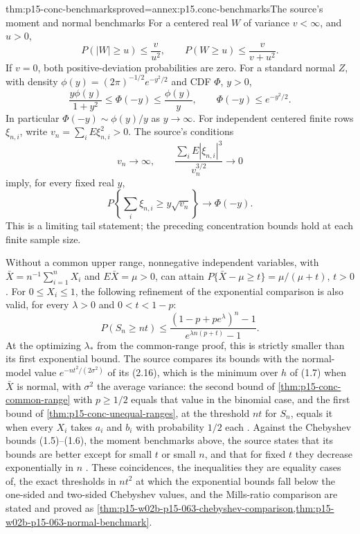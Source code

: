 \begin{hbtheorem}{thm:p15-conc-benchmarks}{proved=annex:p15.conc-benchmarks}{The source's moment and normal benchmarks}
For a centered real \(W\) of variance \(v<\infty\), and \(u>0\),
\[
 P(|W|\geq u)\leq\frac{v}{u^2},\qquad
 P(W\geq u)\leq\frac{v}{v+u^2}.
\]
If \(v=0\), both positive-deviation probabilities are zero.
For a standard normal \(Z\), with density
\(\phi(y)=(2\pi)^{-1/2}e^{-y^2/2}\) and CDF \(\Phi\), \(y>0\),
\[
 \frac{y\phi(y)}{1+y^2}\leq\Phi(-y)\leq\frac{\phi(y)}y,
 \qquad \Phi(-y)\leq e^{-y^2/2}.
\]
In particular \(\Phi(-y)\sim\phi(y)/y\) as \(y\to\infty\).
For independent centered finite rows \(\xi_{n,i}\), write
\(v_n=\sum_iE\xi_{n,i}^2>0\). The source's conditions
\[
 v_n\longrightarrow\infty,\qquad
 \frac{\sum_iE|\xi_{n,i}|^3}{v_n^{3/2}}\longrightarrow0
\]
imply, for every fixed real \(y\),
\[
             P\left\{\sum_i\xi_{n,i}\geq y\sqrt{v_n}\right\}
                                  \longrightarrow\Phi(-y).
\]
This is a limiting tail statement; the preceding concentration
bounds hold at each finite sample size.

Without a common upper range, nonnegative independent variables,
with \(\bar X=n^{-1}\sum_{i=1}^nX_i\) and \(E\bar X=\mu>0\), can attain
\(P\{\bar X-\mu\geq t\}=\mu/(\mu+t)\), \(t>0\).
For \(0\leq X_i\leq1\), the following refinement of the
exponential comparison is also valid, for every \(\lambda>0\)
and \(0<t<1-p\):
\[
 P(S_n\geq nt)\leq
 \frac{(1-p+pe^\lambda)^n-1}
      {e^{\lambda n(p+t)}-1}.
\]
At the optimizing \(\lambda_*\) from the common-range proof,
this is strictly smaller than its first exponential bound.
The source compares its bounds with the normal-model value
\(e^{-nt^2/(2\sigma^2)}\) of its (2.16), which is the minimum over \(h\)
of (1.7) when \(\bar X\) is normal, with \(\sigma^2\) the average
variance: the second bound of \cref{thm:p15-conc-common-range} with
\(p\geq1/2\) equals that value in the binomial case, and the first bound
of \cref{thm:p15-conc-unequal-ranges}, at the threshold \(nt\) for
\(S_n\), equals it when every \(X_i\) takes \(a_i\) and \(b_i\) with
probability \(1/2\) each \cite[p.~17]{Hoeffding1963BoundedSums}. Against
the Chebyshev bounds (1.5)--(1.6), the moment benchmarks above, the
source states that its bounds are better except for small \(t\) or small
\(n\), and that for fixed \(t\) they decrease exponentially in \(n\)
\cite[p.~14]{Hoeffding1963BoundedSums}. These coincidences, the
inequalities they are equality cases of, the exact thresholds in
\(nt^2\) at which the exponential bounds fall below the one-sided and
two-sided Chebyshev values, and the Mills-ratio comparison are stated and
proved as
\cref{thm:p15-w02b-p15-063-chebyshev-comparison,thm:p15-w02b-p15-063-normal-benchmark}.
\end{hbtheorem}

